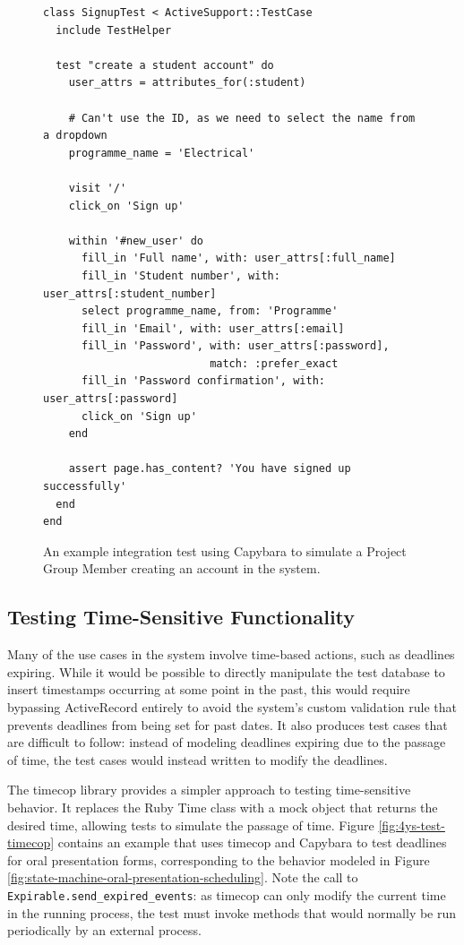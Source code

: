 \documentclass[document.tex]{subfiles}
\begin{document}
\begin{figure}[!ht]
  \begin{lstlisting}
class SignupTest < ActiveSupport::TestCase
  include TestHelper

  test "create a student account" do
    user_attrs = attributes_for(:student)

    # Can't use the ID, as we need to select the name from a dropdown
    programme_name = 'Electrical'

    visit '/'
    click_on 'Sign up'

    within '#new_user' do
      fill_in 'Full name', with: user_attrs[:full_name]
      fill_in 'Student number', with: user_attrs[:student_number]
      select programme_name, from: 'Programme'
      fill_in 'Email', with: user_attrs[:email]
      fill_in 'Password', with: user_attrs[:password],
                          match: :prefer_exact
      fill_in 'Password confirmation', with: user_attrs[:password]
      click_on 'Sign up'
    end

    assert page.has_content? 'You have signed up successfully'
  end
end
  \end{lstlisting}
  \cprotect \caption{An example integration test using Capybara to simulate a Project Group Member creating an account in the system.}
  \label{fig:4ys-test-signup}
\end{figure}


\subsection {Testing Time-Sensitive Functionality}

Many of the use cases in the system involve time-based actions, such as deadlines expiring. While it would be possible to directly manipulate the test database to insert timestamps occurring at some point in the past, this would require bypassing ActiveRecord entirely to avoid the system's custom validation rule that prevents deadlines from being set for past dates. It also produces test cases that are difficult to follow: instead of modeling deadlines expiring due to the passage of time, the test cases would instead written to modify the deadlines.

The timecop \cite{timecop} library provides a simpler approach to testing time-sensitive behavior. It replaces the Ruby Time class with a mock object that returns the desired time, allowing tests to simulate the passage of time. Figure \ref{fig:4ys-test-timecop} contains an example that uses timecop and Capybara to test deadlines for oral presentation forms, corresponding to the behavior modeled in Figure \ref{fig:state-machine-oral-presentation-scheduling}. Note the call to \verb!Expirable.send_expired_events!: as timecop can only modify the current time in the running process, the test must invoke methods that would normally be run periodically by an external process.
\end{document}
